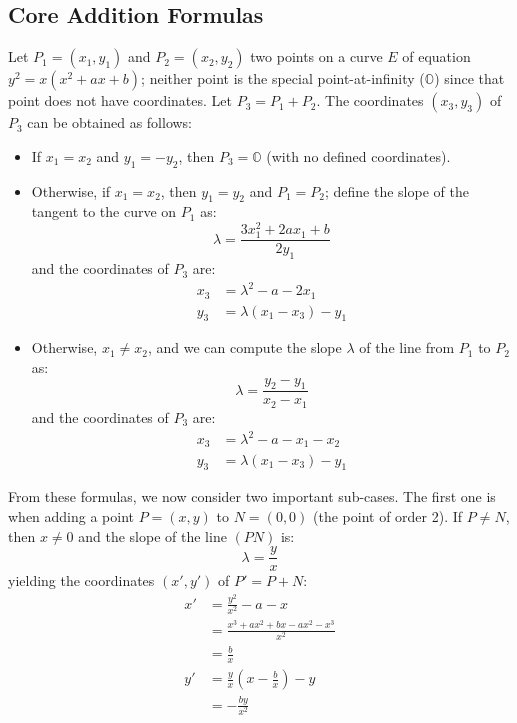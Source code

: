 \documentclass{llncs}
\newcommand{\neutral}{\mathbb{O}}
\begin{document}
\subsection{Core Addition Formulas}\label{sec:structure:coreformulas}

Let $P_1 = (x_1, y_1)$ and $P_2 = (x_2, y_2)$ two points on a curve $E$
of equation $y^2 = x(x^2 + ax + b)$; neither point is the special
point-at-infinity ($\neutral$) since that point does not have coordinates.
Let $P_3 = P_1 + P_2$. The coordinates $(x_3, y_3)$ of $P_3$ can be
obtained as follows:
\begin{itemize}

    \item If $x_1 = x_2$ and $y_1 = -y_2$, then $P_3 = \neutral$ (with
    no defined coordinates).

    \item Otherwise, if $x_1 = x_2$, then $y_1 = y_2$ and $P_1 = P_2$;
    define the slope of the tangent to the curve on $P_1$ as:
    \begin{equation*}
        \lambda = \frac{3x_1^2 + 2ax_1 + b}{2y_1}
    \end{equation*}
    and the coordinates of $P_3$ are:
    \begin{align*}
        x_3 &= \lambda^2 - a - 2x_1 \\
        y_3 &= \lambda(x_1 - x_3) - y_1
    \end{align*}

    \item Otherwise, $x_1 \neq x_2$, and we can compute the slope
    $\lambda$ of the line from $P_1$ to $P_2$ as:
    \begin{equation*}
        \lambda = \frac{y_2 - y_1}{x_2 - x_1}
    \end{equation*}
    and the coordinates of $P_3$ are:
    \begin{align*}
        x_3 &= \lambda^2 - a - x_1 - x_2 \\
        y_3 &= \lambda(x_1 - x_3) - y_1
    \end{align*}

\end{itemize}

From these formulas, we now consider two important sub-cases. The
first one is when adding a point $P = (x, y)$ to $N = (0, 0)$ (the
point of order 2). If $P \neq N$, then $x \neq 0$ and the slope
of the line $(PN)$ is:
\begin{equation*}
    \lambda = \frac{y}{x}
\end{equation*}
yielding the coordinates $(x', y')$ of $P' = P + N$:
\begin{align*}
    x' &= \frac{y^2}{x^2} - a - x \\
       &= \frac{x^3 + ax^2 + bx - ax^2 - x^3}{x^2} \\
       &= \frac{b}{x} \\[2ex]
    y' &= \frac{y}{x}\left(x - \frac{b}{x}\right) - y \\
       &= -\frac{by}{x^2}
\end{align*}
\end{document}
